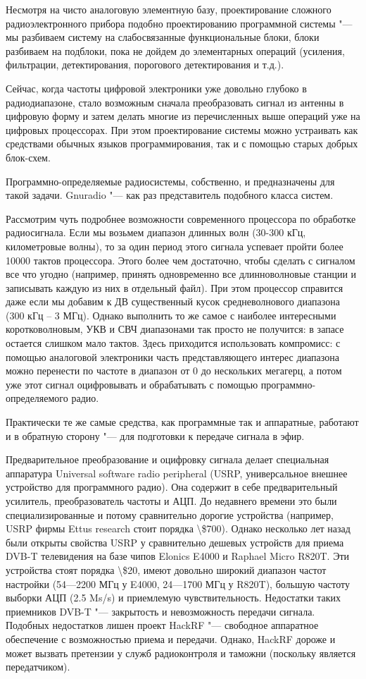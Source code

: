 \documentclass[10pt, a5paper]{article}
\begin{document}
Несмотря на чисто аналоговую элементную базу, проектирование сложного радиоэлектронного прибора подобно проектированию программной системы "--- мы разбиваем систему на слабосвязанные функциональные блоки, блоки разбиваем на подблоки, пока не дойдем до элементарных операций (усиления, фильтрации, детектирования, порогового детектирования и т.д.).

Сейчас, когда частоты цифровой электроники уже довольно глубоко в радиодиапазоне, стало возможным сначала преобразовать сигнал из антенны в цифровую форму и затем делать многие из перечисленных выше операций уже на цифровых процессорах. При этом проектирование системы можно устраивать как средствами обычных языков программирования, так и с помощью старых добрых блок-схем.

Программно-определяемые радиосистемы, собственно, и предназначены для такой задачи. Gnuradio "--- как раз представитель подобного класса систем.

Рассмотрим чуть подробнее возможности современного процессора по обработке радиосигнала. Если мы возьмем диапазон длинных волн (30-300 кГц, километровые волны), то за один период этого сигнала успевает пройти более 10000 тактов процессора. Этого более чем достаточно, чтобы сделать с сигналом все что угодно (например, принять одновременно все длинноволновые станции и записывать каждую из них в отдельный файл). При этом процессор справится даже если мы добавим к ДВ существенный кусок средневолнового диапазона (300 кГц -- 3 МГц). Однако выполнить то же самое с наиболее интересными коротковолновым, УКВ и СВЧ диапазонами так просто не получится: в запасе остается слишком мало тактов. Здесь приходится использовать компромисс: с помощью аналоговой электроники часть представляющего интерес диапазона можно перенести по частоте в диапазон от 0 до нескольких мегагерц, а потом уже этот сигнал оцифровывать и обрабатывать с помощью программно-определяемого радио.

Практически те же самые средства, как программные так и аппаратные, работают и в обратную сторону "--- для подготовки к передаче сигнала в эфир.

Предварительное преобразование и оцифровку сигнала делает специальная аппаратура Universal software radio peripheral (USRP, универсальное внешнее устройство для программного радио). Она содержит в себе предварительный усилитель, преобразователь частоты и АЦП. До недавнего времени это были специализированные и потому сравнительно дорогие устройства (например, USRP фирмы Ettus research стоит порядка \textbackslash{}\$700). Однако несколько лет назад были открыты свойства USRP у сравнительно дешевых устройств для приема DVB-T телевидения на базе чипов Elonics E4000 и Raphael Micro R820T. Эти устройства стоят порядка \textbackslash{}\$20, имеют довольно широкий диапазон частот настройки (54---2200 МГц у E4000, 24---1700 МГц у R820T), большую частоту выборки АЦП (2.5 Ms/s) и приемлемую чувствительность. Недостатки таких приемников DVB-T "--- закрытость и невозможность передачи сигнала. Подобных недостатков лишен проект HackRF "--- свободное аппаратное обеспечение с возможностью приема и передачи. Однако, HackRF дороже и может вызвать претензии у служб радиоконтроля и таможни (поскольку является передатчиком).
\end{document}
